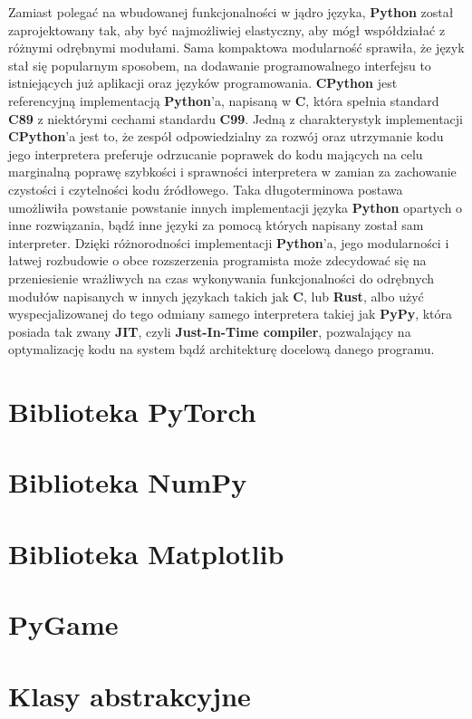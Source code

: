 Zamiast polegać na wbudowanej funkcjonalności w jądro języka, \textbf{Python} został zaprojektowany tak, aby być najmożliwiej elastyczny, aby mógł współdziałać z różnymi odrębnymi modułami. Sama kompaktowa modularność sprawiła, że język stał się popularnym sposobem, na dodawanie programowalnego interfejsu to istniejących już aplikacji oraz języków programowania.
\textbf{CPython} jest referencyjną implementacją \textbf{Python}'a, napisaną w \textbf{C}, która spełnia standard \textbf{C89} z niektórymi cechami standardu \textbf{C99}. Jedną z charakterystyk implementacji \textbf{CPython}'a jest to, że zespół odpowiedzialny za rozwój oraz utrzymanie kodu jego interpretera preferuje odrzucanie poprawek do kodu mających na celu marginalną poprawę szybkości i sprawności interpretera w zamian za zachowanie czystości i czytelności kodu źródłowego. Taka długoterminowa postawa umożliwiła powstanie powstanie innych implementacji języka \textbf{Python} opartych o inne rozwiązania, bądź inne języki za pomocą których napisany został sam interpreter. Dzięki różnorodności implementacji \textbf{Python}'a, jego modularności i łatwej rozbudowie o obce rozszerzenia programista może zdecydować się na przeniesienie wrażliwych na czas wykonywania funkcjonalności do odrębnych modułów napisanych w innych językach takich jak \textbf{C}, lub \textbf{Rust}, albo użyć wyspecjalizowanej do tego odmiany samego interpretera takiej jak \textbf{PyPy}, która posiada tak zwany \textbf{JIT}, czyli \textbf{Just-In-Time compiler}, pozwalający na optymalizację kodu na system bądź architekturę docelową danego programu.



\section{Biblioteka PyTorch}


\section{Biblioteka NumPy}


\section{Biblioteka Matplotlib}

\section{PyGame}


\section{Klasy abstrakcyjne}




